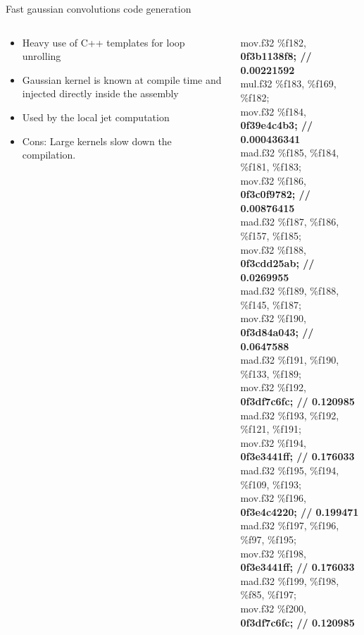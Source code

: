 \documentclass{beamer}
\begin{document}
\begin{frame}[containsverbatim]{Fast gaussian convolutions code generation}

\begin{columns}
\begin{column}[l]{5cm}
  \begin{itemize}
  \item Heavy use of C++ templates for loop unrolling
  \item Gaussian kernel is known at compile time and injected directly
    inside the assembly
  \item Used by the local jet computation
  \item Cons: Large kernels slow down the compilation.
  \end{itemize}
\end{column}
\begin{column}[r]{5cm}
\tiny{mov.f32 	\%f182, \textbf{0f3b1138f8;   	// 0.00221592} \\
mul.f32 	\%f183, \%f169, \%f182;\\
mov.f32 	\%f184, \textbf{0f39e4c4b3;   	// 0.000436341} \\
mad.f32 	\%f185, \%f184, \%f181, \%f183;\\
mov.f32 	\%f186, \textbf{0f3c0f9782;   	// 0.00876415} \\
mad.f32 	\%f187, \%f186, \%f157, \%f185;\\
mov.f32 	\%f188, \textbf{0f3cdd25ab;   	// 0.0269955} \\
mad.f32 	\%f189, \%f188, \%f145, \%f187;\\
mov.f32 	\%f190, \textbf{0f3d84a043;   	// 0.0647588} \\
mad.f32 	\%f191, \%f190, \%f133, \%f189;\\
mov.f32 	\%f192, \textbf{0f3df7c6fc;   	// 0.120985} \\
mad.f32 	\%f193, \%f192, \%f121, \%f191;\\
mov.f32 	\%f194, \textbf{0f3e3441ff;   	// 0.176033} \\
mad.f32 	\%f195, \%f194, \%f109, \%f193;\\
mov.f32 	\%f196, \textbf{0f3e4c4220;   	// 0.199471} \\
mad.f32 	\%f197, \%f196, \%f97, \%f195;\\
mov.f32 	\%f198, \textbf{0f3e3441ff;   	// 0.176033} \\
mad.f32 	\%f199, \%f198, \%f85, \%f197;\\
mov.f32 	\%f200, \textbf{0f3df7c6fc;   	// 0.120985} \\
}
\end{column}
\end{columns}
\end{frame}
\end{document}
